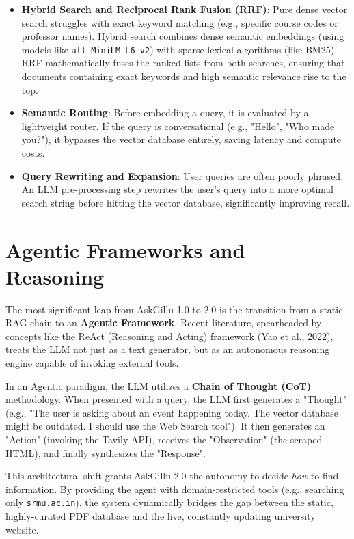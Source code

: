 \documentclass[12pt,a4paper]{report}
\begin{document}
\begin{itemize}
    \item \textbf{Hybrid Search and Reciprocal Rank Fusion (RRF)}: Pure dense vector search struggles with exact keyword matching (e.g., specific course codes or professor names). Hybrid search combines dense semantic embeddings (using models like \texttt{all-MiniLM-L6-v2}) with sparse lexical algorithms (like BM25). RRF mathematically fuses the ranked lists from both searches, ensuring that documents containing exact keywords and high semantic relevance rise to the top.
    \item \textbf{Semantic Routing}: Before embedding a query, it is evaluated by a lightweight router. If the query is conversational (e.g., "Hello", "Who made you?"), it bypasses the vector database entirely, saving latency and compute costs.
    \item \textbf{Query Rewriting and Expansion}: User queries are often poorly phrased. An LLM pre-processing step rewrites the user's query into a more optimal search string before hitting the vector database, significantly improving recall.
\end{itemize}

\section{Agentic Frameworks and Reasoning}
The most significant leap from AskGillu 1.0 to 2.0 is the transition from a static RAG chain to an \textbf{Agentic Framework}. Recent literature, spearheaded by concepts like the ReAct (Reasoning and Acting) framework (Yao et al., 2022), treats the LLM not just as a text generator, but as an autonomous reasoning engine capable of invoking external tools.

In an Agentic paradigm, the LLM utilizes a \textbf{Chain of Thought (CoT)} methodology. When presented with a query, the LLM first generates a "Thought" (e.g., "The user is asking about an event happening today. The vector database might be outdated. I should use the Web Search tool"). It then generates an "Action" (invoking the Tavily API), receives the "Observation" (the scraped HTML), and finally synthesizes the "Response".

This architectural shift grants AskGillu 2.0 the autonomy to decide \textit{how} to find information. By providing the agent with domain-restricted tools (e.g., searching only \texttt{srmu.ac.in}), the system dynamically bridges the gap between the static, highly-curated PDF database and the live, constantly updating university website.
\end{document}
